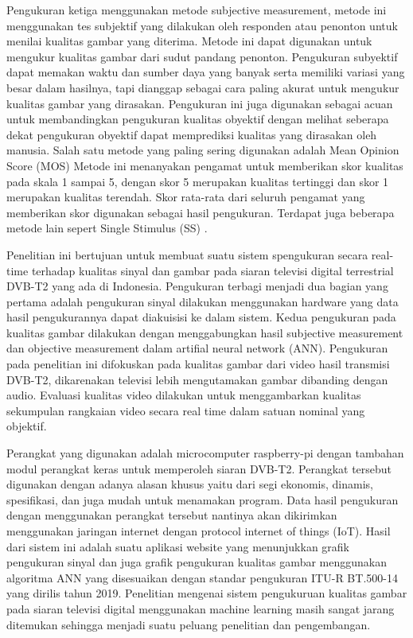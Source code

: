 Pengukuran ketiga menggunakan metode subjective measurement, metode ini menggunakan tes subjektif yang dilakukan oleh responden atau penonton untuk menilai kualitas gambar yang diterima. Metode ini dapat digunakan untuk mengukur kualitas gambar dari sudut pandang penonton. Pengukuran subyektif dapat memakan waktu dan sumber daya yang banyak serta memiliki variasi yang besar dalam hasilnya, tapi dianggap sebagai cara paling akurat untuk mengukur kualitas gambar yang dirasakan. Pengukuran ini juga digunakan sebagai acuan untuk membandingkan pengukuran kualitas obyektif dengan melihat seberapa dekat pengukuran obyektif dapat memprediksi kualitas yang dirasakan oleh manusia. Salah satu metode yang paling sering digunakan adalah Mean Opinion Score (MOS) Metode ini menanyakan pengamat untuk memberikan skor kualitas pada skala 1 sampai 5, dengan skor 5 merupakan kualitas tertinggi dan skor 1 merupakan kualitas terendah. Skor rata-rata dari seluruh pengamat yang memberikan skor digunakan sebagai hasil pengukuran. Terdapat juga beberapa metode lain sepert Single Stimulus (SS) \citep{Romass2013}.

Penelitian ini bertujuan untuk membuat suatu sistem spengukuran secara real-time terhadap kualitas sinyal dan gambar pada siaran televisi digital terrestrial DVB-T2 yang ada di Indonesia. Pengukuran terbagi menjadi dua bagian yang pertama adalah pengukuran sinyal dilakukan menggunakan hardware yang data hasil pengukurannya dapat diakuisisi ke dalam sistem. Kedua pengukuran pada kualitas gambar dilakukan dengan menggabungkan hasil subjective measurement dan objective measurement dalam artifial neural network (ANN). Pengukuran pada penelitian ini difokuskan pada kualitas gambar dari video hasil transmisi DVB-T2, dikarenakan televisi lebih mengutamakan gambar dibanding dengan audio. Evaluasi kualitas video dilakukan untuk menggambarkan kualitas sekumpulan rangkaian video secara real time dalam satuan nominal yang objektif.

 Perangkat yang digunakan adalah microcomputer raspberry-pi dengan tambahan modul perangkat keras untuk memperoleh siaran DVB-T2. Perangkat tersebut digunakan dengan adanya alasan khusus yaitu dari segi ekonomis, dinamis, spesifikasi, dan juga mudah untuk menamakan program. Data hasil pengukuran dengan menggunakan perangkat tersebut nantinya akan dikirimkan menggunakan jaringan internet dengan protocol internet of things (IoT). Hasil dari sistem ini adalah suatu aplikasi website yang menunjukkan grafik pengukuran sinyal dan juga grafik pengukuran kualitas gambar menggunakan algoritma ANN yang disesuaikan dengan standar pengukuran ITU-R BT.500-14 yang dirilis tahun 2019. Penelitian mengenai sistem pengukuruan kualitas gambar pada siaran televisi digital menggunakan machine learning masih sangat jarang ditemukan sehingga menjadi suatu peluang penelitian dan pengembangan.
 

